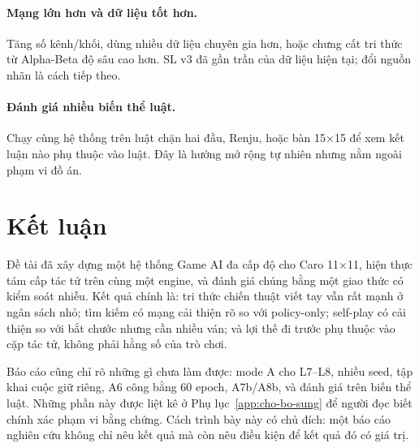 \paragraph{Mạng lớn hơn và dữ liệu tốt hơn.} Tăng số kênh/khối, dùng nhiều dữ liệu chuyên gia
hơn, hoặc chưng cất tri thức từ Alpha-Beta độ sâu cao hơn. SL v3 đã gần trần của dữ liệu hiện
tại; đổi nguồn nhãn là cách tiếp theo.

\paragraph{Đánh giá nhiều biến thể luật.} Chạy cùng hệ thống trên luật chặn hai đầu, Renju, hoặc
bàn 15×15 để xem kết luận nào phụ thuộc vào luật. Đây là hướng mở rộng tự nhiên nhưng nằm
ngoài phạm vi đồ án.

\section{Kết luận}
\label{sec:kl-ket}
Đề tài đã xây dựng một hệ thống Game AI đa cấp độ cho Caro 11×11, hiện thực tám cấp tác tử trên
cùng một engine, và đánh giá chúng bằng một giao thức có kiểm soát nhiễu. Kết quả chính là:
tri thức chiến thuật viết tay vẫn rất mạnh ở ngân sách nhỏ; tìm kiếm có mạng cải thiện rõ so
với policy-only; self-play có cải thiện so với bắt chước nhưng cần nhiều ván; và lợi thế đi
trước phụ thuộc vào cặp tác tử, không phải hằng số của trò chơi.

Báo cáo cũng chỉ rõ những gì chưa làm được: mode A cho L7--L8, nhiều seed, tập khai cuộc giữ
riêng, A6 công bằng 60 epoch, A7b/A8b, và đánh giá trên biến thể luật. Những phần này được liệt kê ở
Phụ lục~\ref{app:cho-bo-sung} để người đọc biết chính xác phạm vi bằng chứng. Cách trình bày
này có chủ đích: một báo cáo nghiên cứu không chỉ nêu kết quả mà còn nêu điều kiện để kết quả
đó có giá trị.